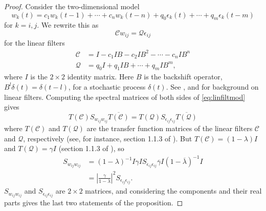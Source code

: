 \documentclass[letterpaper,11pt]{article}
\begin{document}
\begin{proof}
Consider the two-dimensional model
\begin{equation}
w_{k}(t) =c_{ 1}w_{k}(t- 1)+\cdots+c_{n}w_{k}(t-n)+q_{  0}\epsilon_{k}(t)  +\cdots+q_{m}\epsilon_{k}(t-m)
\end{equation}
for $k=i,j$. We rewrite this as
\begin{equation}
\mathcal{C} w_{ij} = \mathcal{Q} \epsilon_{ij} \label{eq:linfiltmod}
\end{equation}
for the linear filters
\begin{align}
\mathcal{C} &= I-c_1 IB - c_2 IB^2 - \cdots - c_n IB^n \\
\mathcal{Q} &= q_0 I + q_1 IB + \cdots + q_m IB^m,
\end{align}
where $I$ is the $2 \times 2$ identity matrix. 
Here $B$ is the backshift operator,
$B^{l}\delta(t)=\delta(t-l)$, for a stochastic process $\delta(t)$.
See \cite{Brillinger2011}, \cite{Reinsel1997} and \cite{Shumway2000}
for background on linear filters. Computing the spectral matrices of both
sides of \ref{eq:linfiltmod} gives
\begin{equation}
T(\mathcal{C}) S_{w_{ij}w_{ij}} \overline{T(\mathcal{C})} = T(\mathcal{Q}) S_{\epsilon_{ij}\epsilon_{ij}}
\overline{T(\mathcal{Q})}
\end{equation}
where $T(\mathcal{C})$ and $T(\mathcal{Q})$ 
are the transfer function matrices of the linear filters
$\mathcal{C}$ and $\mathcal{Q}$, respectively (see, for instance,
section 1.1.3 of \citealp{Reinsel1997}). But 
$T(\mathcal{C}) = (1-\lambda)I$ and $T(\mathcal{Q})=\gamma I$
(section 1.1.3 of \citealp{Reinsel1997}), so
\begin{align}
S_{w_{ij}w_{ij}} &= (1-\lambda)^{-1} I \gamma I S_{\epsilon_{ij}\epsilon_{ij}} \overline{\gamma} I (1-\overline{\lambda})^{-1}I \\
&= \left| \frac{\gamma}{1-\lambda} \right|^2 S_{\epsilon_{ij}\epsilon_{ij}}.
\end{align}
$S_{w_{ij}w_{ij}}$ and $S_{\epsilon_{ij}\epsilon_{ij}}$ are $2 \times 2$ matrices, and considering the components and their real parts gives the last two statements of
the proposition.
\end{proof}
\end{document}
